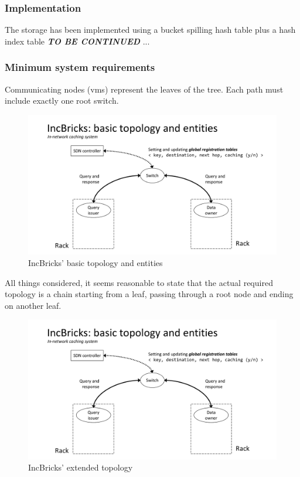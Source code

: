 \subsubsection{Implementation}
The storage has been implemented using a bucket spilling hash table plus a hash index table
\textbf{\textit{TO BE CONTINUED}} ...

\subsubsection{Minimum system requirements}
Communicating nodes (\glspl{vm}) represent the leaves of the tree.
Each path must include exactly one root switch.

\begin{figure}[!htb]
    \centering
        \includegraphics[page=1, clip, trim=3.6cm 0.7cm 2.5cm 4.15cm, width=1.00\textwidth]{figures/analysis/inp/presentation.pdf}
    \caption{IncBricks' \texorpdfstring{\cite{incbricks}}{} basic topology and entities}
\end{figure}

All things considered, it seems reasonable to state that the actual required topology is a chain starting from a leaf, passing through a root node and ending on another leaf.

\begin{figure}[!htb]
    \centering
        \includegraphics[page=2, clip, trim=3.6cm 0.7cm 2.5cm 4.15cm, width=1.00\textwidth]{figures/analysis/inp/presentation.pdf}
    \caption{IncBricks' \texorpdfstring{\cite{incbricks}}{} extended topology}
\end{figure}

